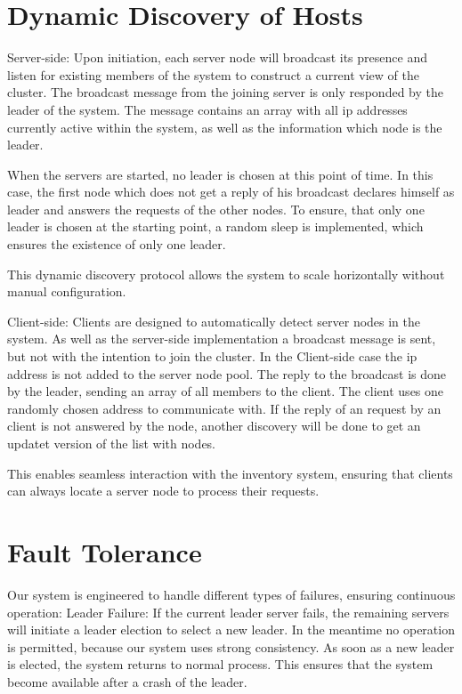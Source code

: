 \section{Dynamic Discovery of Hosts}\label{sec:DynamicDiscoveryOfHosts}
Server-side: Upon initiation, each server node will broadcast its presence and listen for existing members of the system to construct a current view of the cluster. The broadcast message from the joining server is only responded by the
leader of the system. The message contains an array with all ip addresses currently active within the system, as well as the information which node is the leader.

When the servers are started, no leader is chosen at this point of time. In this case, the first node which does not get a reply of his broadcast declares himself as leader and answers the requests of the other nodes.
To ensure, that only one leader is chosen at the starting point, a random sleep is implemented, which ensures the existence of only one leader.

This dynamic discovery protocol allows the system to scale horizontally without manual configuration.

Client-side: Clients are designed to automatically detect server nodes in the system. As well as the server-side implementation a broadcast message is sent, but not with the intention
to join the cluster. In the Client-side case the ip address is not added to the server node pool. The reply to the broadcast is done by the leader, sending an array of all members to the client. 
The client uses one randomly chosen address to communicate with. If the reply of an request by an client is not answered by the node, another discovery will be done to get an updatet version of the list with nodes.

This enables seamless interaction with the inventory system, ensuring that clients can always locate a server node to process their requests.

\section{Fault Tolerance}\label{sec:FaultTolerance}
Our system is engineered to handle different types of failures, ensuring continuous operation:
Leader Failure: If the current leader server fails, the remaining servers will initiate a leader election to select a new leader. In the meantime no operation is permitted, because our system uses strong consistency. As soon as a new leader is elected, the system returns to normal process.
This ensures that the system become available after a crash of the leader.


